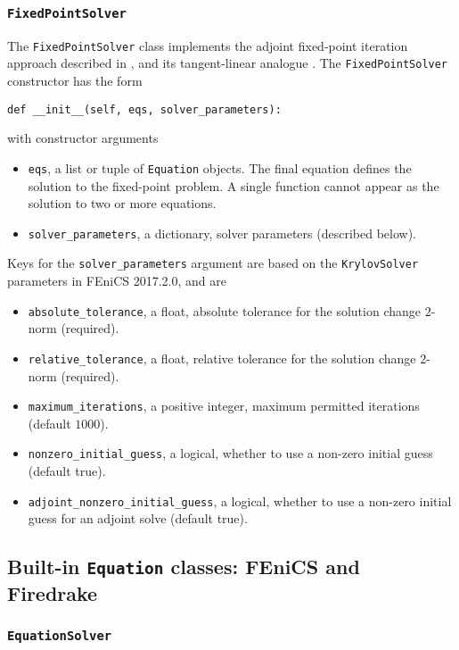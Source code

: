 \documentclass[11pt]{article}
\begin{document}
\subsubsection{\texttt{FixedPointSolver}}

The \texttt{FixedPointSolver} class implements the adjoint fixed-point
iteration approach described in \citet{christianson1994}, and its
tangent-linear analogue \citep{gilbert1992}. The \texttt{FixedPointSolver}
constructor has the form
\begin{lstlisting}
def __init__(self, eqs, solver_parameters):
\end{lstlisting}
with constructor arguments
\begin{itemize}
  \item \texttt{eqs}, a list or tuple of \texttt{Equation} objects. The final
    equation defines the solution to the fixed-point problem. A single function
    cannot appear as the solution to two or more equations.
  \item \texttt{solver\_parameters}, a dictionary, solver parameters (described
    below).
\end{itemize}
Keys for the \texttt{solver\_parameters} argument are based on the
\texttt{KrylovSolver} parameters in FEniCS 2017.2.0, and are
\begin{itemize}
  \item \texttt{absolute\_tolerance}, a float, absolute tolerance for the
    solution change $2$-norm (required).
  \item \texttt{relative\_tolerance}, a float, relative tolerance for the
    solution change $2$-norm (required).
  \item \texttt{maximum\_iterations}, a positive integer, maximum permitted
    iterations (default $1000$).
  \item \texttt{nonzero\_initial\_guess}, a logical, whether to use a non-zero
    initial guess (default true).
  \item \texttt{adjoint\_nonzero\_initial\_guess}, a logical, whether to use a
    non-zero initial guess for an adjoint solve (default true).
\end{itemize}

\subsection{Built-in \texttt{Equation} classes: FEniCS and Firedrake}

\subsubsection{\texttt{EquationSolver}}\label{sect:EquationSolver}
\end{document}
